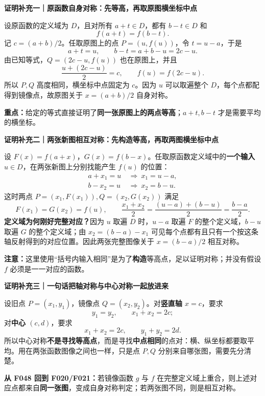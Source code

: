 \clearpage
\begin{proofbox}
\textbf{证明补充一｜原函数自身对称：先等高，再取原图横坐标中点}


设原函数的定义域为 $D$，且对所有 $a+t\in D$，都有 $b-t\in D$ 和
\[f(a+t)=f(b-t).\]
记 $c=(a+b)/2$。任取原图上的点 $P=(u,f(u))$，令 $t=u-a$，于是
\[a+t=u,\qquad b-t=a+b-u=2c-u.\]
由已知等式，$Q=(2c-u,f(u))$ 也在原图上，并且
\[\frac{u+(2c-u)}2=c,\qquad f(u)=f(2c-u).\]
所以 $P,Q$ 高度相同，横坐标中点固定为 $c$。因为 $u$ 可以取遍整个 $D$，每个点都配得到镜像点，故原图关于 $x=(a+b)/2$ 自身对称。

\textbf{重点：}给定的等式直接证明了\textbf{同一张原图上的两点等高}；$a+t,b-t$ 才是需要平均的横坐标。
\end{proofbox}
\clearpage
\begin{proofbox}
\textbf{证明补充二｜两张新图相互对称：先构造等高，再取两图横坐标中点}


设 $F(x)=f(a+x)$，$G(x)=f(b-x)$。任取原函数定义域中的\textbf{一个输入} $u\in D$，在两张新图上分别找能产生 $f(u)$ 的位置：
\[
\begin{aligned}
a+x_1=u &\ \Longrightarrow\ x_1=u-a,\\
b-x_2=u &\ \Longrightarrow\ x_2=b-u.
\end{aligned}
\]
这时两点 $P=(x_1,F(x_1)),Q=(x_2,G(x_2))$ 满足
\[
F(x_1)=G(x_2)=f(u),\qquad
\frac{x_1+x_2}{2}=\frac{(u-a)+(b-u)}2=\frac{b-a}{2}.
\]
\textbf{定义域为何刚好完整对应？}因为 $u$ 取遍 $D$ 时，$u-a$ 取遍 $F$ 的整个定义域，$b-u$ 取遍 $G$ 的整个定义域；由 $x_2=(b-a)-x_1$ 可见每个点都有且只有一个按这条轴反射得到的对应位置。因此两张完整图像关于 $x=(b-a)/2$ 相互对称。

\textbf{注意：}这里使用“括号内输入相同”是为了\textbf{构造}等高点，足以证明对称；并没有假设 $f$ 必须是一一对应的函数。
\end{proofbox}
\clearpage
\begin{proofbox}
\textbf{证明补充三｜一句话把轴对称与中心对称一起放进来}


设旧点 $P=(x_1,y_1)$，镜像点 $Q=(x_2,y_2)$。对\textbf{竖直轴 $x=c$}，要求
\[\boxed{y_1=y_2,\qquad x_1+x_2=2c;}\]
对\textbf{中心 $(c,d)$}，要求
\[\boxed{x_1+x_2=2c,\qquad y_1+y_2=2d.}\]
所以中心对称\textbf{不是寻找等高点}，而是寻找\textbf{中点相同}的点对：横、纵坐标都要取平均。用在两张函数图像之间也一样，只是点 $P,Q$ 分别来自哪张图，需要先分清楚。

\textbf{从 F048 回到 F020/F021：}若镜像函数 $g$ 与 $f$ 在完整定义域上重合，则上述对应点都来自\textbf{同一张图}，变成自身对称判定；若两张图不同，则是相互对称。
\end{proofbox}
